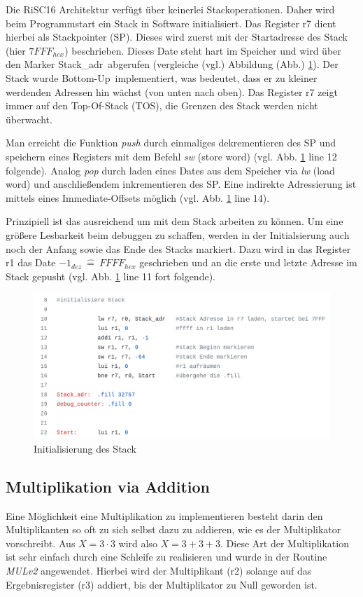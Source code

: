 \documentclass[fleqn, a4paper, 1pt]{article}       %
\begin{document}
Die RiSC16 Architektur verfügt über keinerlei Stackoperationen. Daher wird beim Programmstart ein Stack in Software initialisiert. Das Register r7 dient hierbei als Stackpointer (SP). Dieses wird zuerst mit der Startadresse des Stack (hier $7FFF_{hex}$) beschrieben. Dieses Date steht hart im Speicher und wird über den Marker \glqq Stack\_adr\grqq \ abgerufen (vergleiche (vgl.) Abbildung (Abb.) \ref{fig:Stack}).
Der Stack wurde  \glqq Bottom-Up\grqq \ implementiert, was bedeutet, dass er zu kleiner werdenden Adressen hin wächst (von unten nach oben). Das Register r7 zeigt immer auf den Top-Of-Stack (TOS), die Grenzen des Stack werden nicht überwacht.

Man erreicht die Funktion \emph{push}  durch einmaliges dekrementieren des SP und speichern eines Registers mit dem Befehl \emph{sw} (store word) (vgl. Abb. \ref{fig:Stack} line 12 folgende). Analog \emph{pop} durch laden eines Dates aus dem Speicher via \emph{lw} (load word) und anschließendem inkrementieren des SP. Eine indirekte Adressierung ist mittels eines Immediate-Offsets möglich (vgl. Abb. \ref{fig:Stack} line 14).

Prinzipiell ist das ausreichend um mit dem Stack arbeiten zu können. Um eine größere Lesbarkeit beim debuggen zu schaffen, werden in der Initialsierung auch noch der Anfang sowie das Ende des Stacks markiert. Dazu wird in das Register r1 das Date $-1_{dez}\ \widehat{=}\ FFFF_{hex}$ geschrieben und an die erste und letzte Adresse im Stack gepusht (vgl. Abb. \ref{fig:Stack} line 11 fort folgende).

\begin{figure}[h]
    \includegraphics[width =1\textwidth]{Stack_init.png}
\caption{Initialisierung des Stack}
\label{fig:Stack}
\end{figure}



\subsection{Multiplikation via Addition}
Eine Möglichkeit eine Multiplikation zu implementieren besteht darin den Multiplikanten so oft zu sich selbst dazu zu addieren, wie es der Multiplikator vorschreibt. Aus $X = 3 \cdot 3$ wird also $X = 3+3+3$. Diese Art der Multiplikation ist sehr einfach durch eine Schleife zu realisieren und wurde in der Routine \emph{MULv2} angewendet. Hierbei wird der Multiplikant (r2) solange auf das Ergebnisregister (r3) addiert, bis der Multiplikator zu Null geworden ist. 
\end{document}
